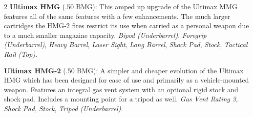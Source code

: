 \documentclass[
  oneside]{article}
\begin{document}
\begin{multicols}{2}
\textbf{Ultimax HMG} (.50 BMG): This amped up
upgrade of the Ultimax MMG features all of the
same features with a few enhancements. The much
larger cartridges the HMG-2 fires restrict its use
when carried as a personal weapon due to a much
smaller magazine capacity. \emph{Bipod
(Underbarrel)}, \emph{Foregrip (Underbarrel)},
\emph{Heavy Barrel}, \emph{Laser Sight},
\emph{Long Barrel}, \emph{Shock Pad},
\emph{Stock}, \emph{Tactical Rail (Top)}.

\textbf{Ultimax HMG-2} (.50 BMG): A simpler and
cheaper evolution of the Ultimax HMG which has
been designed for ease of use and primarily as a
vehicle-mounted weapon. Features an integral gas
vent system with an optional rigid stock and shock
pad. Includes a mounting point for a tripod as
well. \emph{Gas Vent Rating 3}, \emph{Shock Pad},
\emph{Stock}, \emph{Tripod (Underbarrel)}.

\end{multicols}
\end{document}
